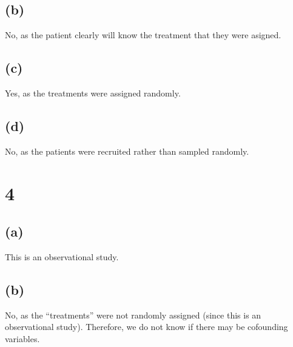 \documentclass[10pt]{article}
\begin{document}
\subsection*{(b)}
No, as the patient clearly will know the treatment that they were asigned.

\subsection*{(c)}
Yes, as the treatments were assigned randomly.

\subsection*{(d)}
No, as the patients were recruited rather than sampled randomly.

\section*{4}

\subsection*{(a)}
This is an observational study.

\subsection*{(b)}
No, as the ``treatments'' were not randomly assigned (since this is an observational study). Therefore, we do not know if there may be cofounding variables.
\end{document}
